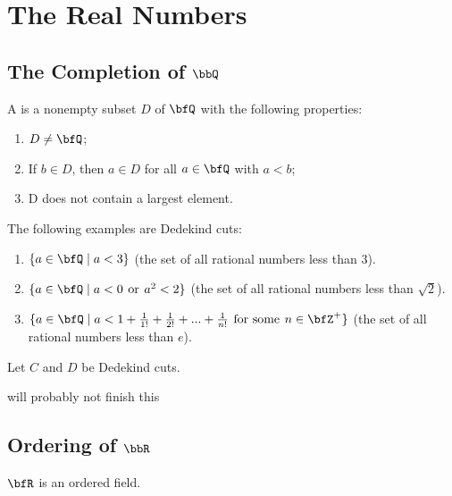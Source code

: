 \chapter{The Real Numbers}\label{chapter:the real numbers}
\vspace{12pt}

\section{The Completion of $\bbQ$}
    \begin{definition}
        A  is a nonempty subset $D$ of $\bfQ$ with the following properties:
            \begin{enumerate}[label = (\arabic*)]
                \item $D \neq \bfQ$;
                \item If $b \in D$, then $a \in D$ for all $a \in \bfQ$ with $a < b$;
                \item D does not contain a largest element.
            \end{enumerate}
    \end{definition}

    \begin{example}
        The following examples are Dedekind cuts:
        \begin{enumerate}[label = (\arabic*)]
            \item $\{a \in \bfQ \mid a < 3\}$ (the set of all rational numbers less than 3).
            \item $\{a \in \bfQ \mid a < 0 \hspace{4pt}\text{or}\hspace{4pt} a^2 < 2\}$ (the set of all rational numbers less than $\sqrt{2}$).
            \item $\{a \in \bfQ \mid a < 1 + \frac{1}{1!} + \frac{1}{2!} + ... + \frac{1}{n!} \hspace{4pt}\text{for some}\hspace{4pt} n \in \bfZ^+\} $ (the set of all rational numbers less than $e$).
        \end{enumerate}
    \end{example}

    \begin{definition}
        Let $C$ and $D$ be Dedekind cuts. 
    \end{definition}
    {\color{red} will probably not finish this}

\section{Ordering of $\bbR$}
    \begin{axiom}
        $\bfR$ is an ordered field.
    \end{axiom}

